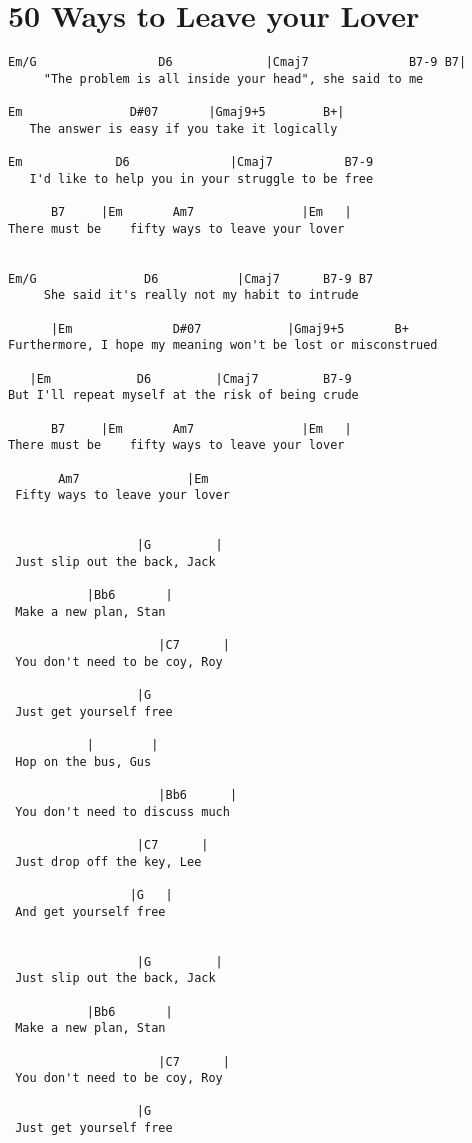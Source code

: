 \documentclass[leqno]{memoir}
\begin{document}
\chapter{50 Ways to Leave your Lover}
\begin{verbatim}
Em/G                 D6             |Cmaj7              B7-9 B7|
     "The problem is all inside your head", she said to me

Em               D#07       |Gmaj9+5        B+|
   The answer is easy if you take it logically

Em             D6              |Cmaj7          B7-9
   I'd like to help you in your struggle to be free

      B7     |Em       Am7               |Em   |
There must be    fifty ways to leave your lover


Em/G               D6           |Cmaj7      B7-9 B7
     She said it's really not my habit to intrude

      |Em              D#07            |Gmaj9+5       B+
Furthermore, I hope my meaning won't be lost or misconstrued

   |Em            D6         |Cmaj7         B7-9
But I'll repeat myself at the risk of being crude

      B7     |Em       Am7               |Em   |
There must be    fifty ways to leave your lover

       Am7               |Em
 Fifty ways to leave your lover


                  |G         |
 Just slip out the back, Jack

           |Bb6       |
 Make a new plan, Stan

                     |C7      |
 You don't need to be coy, Roy

                  |G
 Just get yourself free

           |        |
 Hop on the bus, Gus

                     |Bb6      |
 You don't need to discuss much

                  |C7      |
 Just drop off the key, Lee

                 |G   |
 And get yourself free


                  |G         |
 Just slip out the back, Jack

           |Bb6       |
 Make a new plan, Stan

                     |C7      |
 You don't need to be coy, Roy

                  |G
 Just get yourself free


\end{verbatim}
\end{document}
